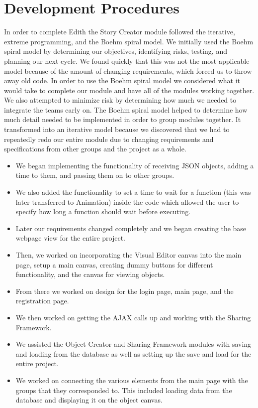 \documentclass[12pt]{article}
\begin{document}
\section{Development Procedures}
In order to complete Edith the Story Creator module followed the iterative, extreme programming, and the Boehm spiral model.  We initially used the Boehm spiral model by determining our objectives, identifying risks, testing, and planning our next cycle.  We found quickly that this was not the most applicable model because of the amount of changing requirements, which forced us to throw away old code.  In order to use the Boehm spiral model we considered what it would take to complete our module and have all of the modules working together.  We also attempted to minimize risk by determining how much we needed to integrate the teams early on.  The Boehm spiral model helped to determine how much detail needed to be implemented in order to group modules together.  It transformed into an iterative model because we discovered that we had to repeatedly redo our entire module due to changing requirements and specifications from other groups and the project as a whole.  
\begin{itemize}


\item We began implementing the functionality of receiving JSON objects, adding a time to them, and passing them on to other groups. 

\item We also added the functionality to set a time to wait for a function (this was later transferred to Animation) inside the code which allowed the user to specify how long a function should wait before executing. 

\item Later our requirements changed completely and we began creating the base webpage view for the entire project. 

\item Then, we worked on incorporating the Visual Editor canvas into the main page, setup a main canvas, creating dummy buttons for different functionality, and the canvas for viewing objects. 

\item From there we worked on design for the login page, main page, and the registration page. 

\item We then worked on getting the AJAX calls up and working with the Sharing Framework.   

\item We assisted the Object Creator and Sharing Framework modules with saving and loading from the database as well as setting up the save and load for the entire project. 

\item We worked on connecting the various elements from the main page with the groups that they corresponded to.  This included loading data from the database and displaying it on the object canvas.  \\

\end{itemize}
\end{document}
